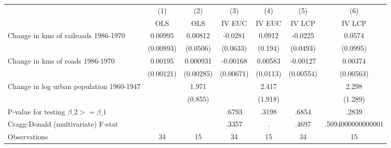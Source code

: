 {
\def\sym#1{\ifmmode^{#1}\else\(^{#1}\)\fi}
\begin{tabular}{l*{6}{c}}
\hline\hline
                &\multicolumn{1}{c}{(1)}&\multicolumn{1}{c}{(2)}&\multicolumn{1}{c}{(3)}&\multicolumn{1}{c}{(4)}&\multicolumn{1}{c}{(5)}&\multicolumn{1}{c}{(6)}\\
                &\multicolumn{1}{c}{OLS}&\multicolumn{1}{c}{OLS}&\multicolumn{1}{c}{IV EUC}&\multicolumn{1}{c}{IV EUC}&\multicolumn{1}{c}{IV LCP}&\multicolumn{1}{c}{IV LCP}\\
\hline
Change in kms of railroads 1986-1970&  0.00995         &  0.00812         &  -0.0281         &   0.0912         &  -0.0225         &   0.0574         \\
                &(0.00893)         & (0.0506)         & (0.0633)         &  (0.194)         & (0.0493)         & (0.0995)         \\
[1em]
Change in kms of roads 1986-1970&  0.00195         & 0.000931         & -0.00168         &  0.00583         & -0.00127         &  0.00374         \\
                &(0.00121)         &(0.00285)         &(0.00671)         & (0.0113)         &(0.00554)         &(0.00563)         \\
[1em]
Change in log urban population 1960-1947&                  &    1.971         &                  &    2.417         &                  &    2.298         \\
                &                  &  (0.855)         &                  &  (1.918)         &                  &  (1.289)         \\
\hline
P-value for testing $\beta\_{2} >= \beta\_{1}$&                  &                  &    .6793         &    .3198         &    .6854         &    .2839         \\
Cragg-Donald (multivariate) F-stat&                  &                  &    .3357         &        .         &    .4697         &.5094000000000001         \\
Observations    &       34         &       15         &       34         &       15         &       34         &       15         \\
\hline\hline
\end{tabular}
}

